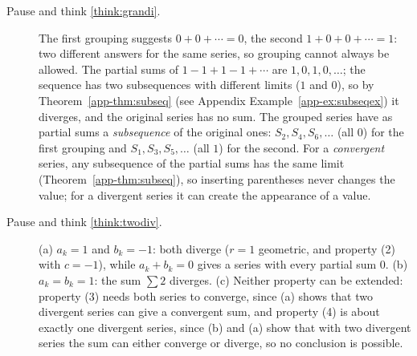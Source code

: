 \documentclass[11pt]{article}
\begin{document}
\begin{description}
  \item[Pause and think \ref{think:grandi}.] The first grouping suggests $0+0+\cdots=0$, the second $1+0+0+\cdots=1$: two different answers for the same series, so grouping cannot always be allowed. The partial sums of $1-1+1-1+\cdots$ are $1,0,1,0,\dots$; the sequence has two subsequences with different limits ($1$ and $0$), so by Theorem~\ref{app-thm:subseq} (see Appendix Example~\ref{app-ex:subseqex}) it diverges, and the original series has no sum. The grouped series have as partial sums a \emph{subsequence} of the original ones: $S_2,S_4,S_6,\dots$ (all $0$) for the first grouping and $S_1,S_3,S_5,\dots$ (all $1$) for the second. For a \emph{convergent} series, any subsequence of the partial sums has the same limit (Theorem~\ref{app-thm:subseq}), so inserting parentheses never changes the value; for a divergent series it can create the appearance of a value.
  \item[Pause and think \ref{think:twodiv}.] (a) $a_k=1$ and $b_k=-1$: both diverge ($r=1$ geometric, and property (2) with $c=-1$), while $a_k+b_k=0$ gives a series with every partial sum $0$. (b) $a_k=b_k=1$: the sum $\sum2$ diverges. (c) Neither property can be extended: property (3) needs both series to converge, since (a) shows that two divergent series can give a convergent sum, and property (4) is about exactly one divergent series, since (b) and (a) show that with two divergent series the sum can either converge or diverge, so no conclusion is possible.
\end{description}
\end{document}
